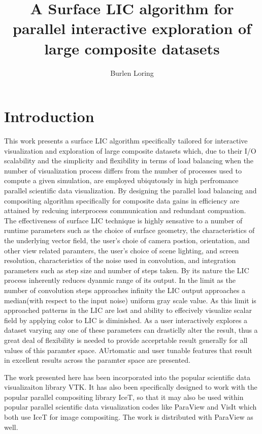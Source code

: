 \documentclass[a4paper,10pt]{article}
\title{A Surface LIC algorithm for parallel interactive exploration of large composite datasets}
\author{Burlen Loring}
\begin{document}
\maketitle

\begin{abstract}

\end{abstract}

\section{Introduction}
This work presents a surface LIC algorithm specifically tailored for interactive visualization and exploration of large composite datasets which, due to their I/O scalability and the simplicity and flexibility in terms of load balancing when the number of visualization process differs from the number of processes used to compute a given simulation, are employed ubiqutously in high perfromance parallel scientific data visualization. By designing the parallel load balancing and compositing algorithm specifically for composite data gains in efficiency are attained by redcuing interprocess communication and redundant compuation. The effectiveness of surface LIC technique is highly sensative to a number of runtime parameters such as the choice of surface geometry, the characteristics of the underlying vector field, the user's choie of camera postion, orientation, and other view related paramters, the user's choice of scene lighting, and screen resolution, characteristics of the noise used in convolution, and integration parameters such as step size and number of steps taken. By its nature the LIC process inherently reduces dyanmic range of its output. In the limit as the number of convolution steps approaches infinity the LIC output approaches a median(with respect to the input noise) uniform gray scale value. As this limit is approached patterns in the LIC are lost and ability to effecively visualize scalar field by applying color to LIC is diminished. As a user interactively explores a dataset varying any one of these parameters can drasticlly alter the result, thus a great deal of flexibility is needed to provide acceprtable result generally for all values of this paramter space. AUrtomatic and user tunable features that result in excellent results across the paramter space are presented. 

The work presented here has been incorporated into the popular scientific data visualizaiton library VTK. It has also been specifically designed to work with the popular parallel compositing library IceT, so that it may also be used within popular parallel scientific data visualization codes like ParaView and VisIt which both use IceT for image compositing. The work is distributed with ParaView as well.
\FloatBarrier 
\end{document}
